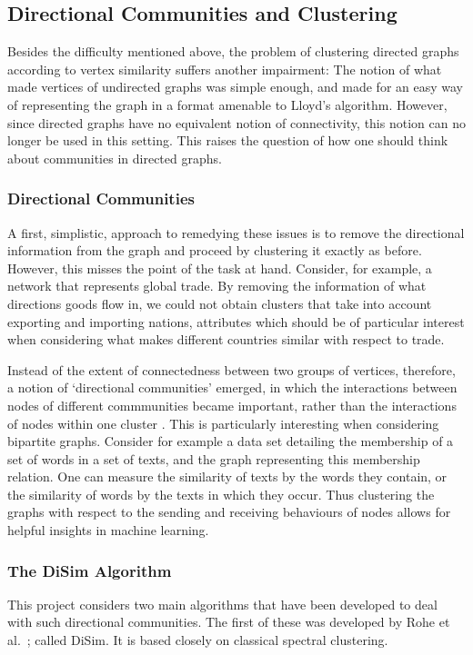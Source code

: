 \subsection{Directional Communities and Clustering}

Besides the difficulty mentioned above, the problem of clustering directed graphs according to 
vertex similarity suffers another impairment: The notion of what made vertices of undirected 
graphs was simple enough, and made for an easy way of representing the graph in a format amenable 
to Lloyd's algorithm. However, since directed graphs have no equivalent notion of connectivity, 
this notion can no longer be used in this setting. This raises the question of how one should 
think about communities in directed graphs. 

\subsubsection{Directional Communities}
A first, simplistic, approach to remedying these issues is to remove the directional information 
from the graph and proceed by clustering it exactly as before. However, this misses the point of 
the task at hand. Consider, for example, a network that represents global trade. By removing the 
information of what directions goods flow in, we could not obtain clusters that take into account 
exporting and importing nations, attributes which should be of particular interest when  
considering what makes different countries similar with respect to trade. 

Instead of the extent of connectedness between two groups of vertices, therefore, a notion of 
`directional communities' emerged, in which the interactions between nodes of different 
commmunities became important, rather than the interactions of nodes within one cluster \cite{lucapaper, disimpaper}. 
This is particularly interesting when considering bipartite graphs. Consider for example a data 
set detailing the membership of a set of words in a set of texts, and the graph representing this 
membership relation. One can measure the similarity of texts by the words they contain, or the 
similarity of words by the texts in which they occur. Thus clustering the graphs with respect to the sending and receiving behaviours of nodes allows for helpful insights in machine learning. 

\subsubsection{The DiSim Algorithm}
This project considers two main algorithms that have been developed to deal with such directional 
communities. The first of these was developed by Rohe et al.\ \cite{disimpaper}; called DiSim. It
is based closely on classical spectral clustering.

